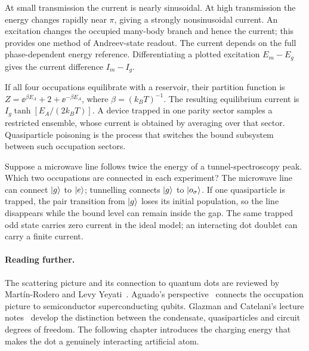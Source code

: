 At small transmission the current is nearly sinusoidal. At high transmission
the energy changes rapidly near $\pi$, giving a strongly nonsinusoidal current.
An excitation changes the occupied many-body branch and hence the current; this
provides one method of Andreev-state readout. The current depends on the full
phase-dependent energy reference. Differentiating a plotted excitation
$E_m-E_g$ gives the current difference $I_m-I_g$.

If all four occupations equilibrate with a reservoir, their partition function is
$Z=\ee^{\beta E_A}+2+\ee^{-\beta E_A}$, where $\beta=(k_BT)^{-1}$. The resulting
equilibrium current is $I_g\tanh[E_A/(2k_BT)]$. A device trapped in one parity
sector samples a restricted ensemble, whose current is obtained by averaging over
that sector. Quasiparticle poisoning is the process that switches
the bound subsystem between such occupation sectors.

\begin{physics}
Suppose a microwave line follows twice the energy of a tunnel-spectroscopy peak.
Which two occupations are connected in each experiment? The microwave line can
connect $\lvert g\rangle$ to $\lvert e\rangle$; tunnelling connects $\lvert g\rangle$ to $\lvert o_\sigma\rangle$.
If one quasiparticle is trapped, the pair transition from $\lvert g\rangle$ loses its
initial population, so the line disappears while the bound level can remain
inside the gap. The same trapped odd state carries zero current in the ideal
model; an interacting dot doublet can carry a finite current.
\end{physics}

\paragraph{Reading further.}
The scattering picture and its connection to quantum dots are reviewed by
Mart\'in-Rodero and Levy Yeyati~\cite{martinrodero2011josephson}. Aguado's
perspective~\cite{aguado2020perspective} connects the occupation picture to
semiconductor superconducting qubits. Glazman and Catelani's lecture
notes~\cite{glazman2021bogoliubov} develop the distinction between the condensate,
quasiparticles and circuit degrees of freedom. The following chapter introduces
the charging energy that makes the dot a genuinely interacting artificial atom.

